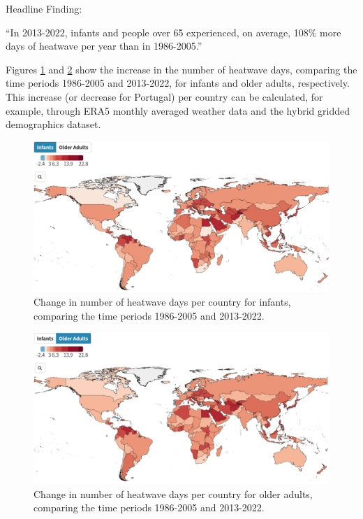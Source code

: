 \documentclass[
]{krantz}
\begin{document}
Headline Finding:

``In 2013-2022, infants and people over 65 experienced, on average, 108\% more days of heatwave per year than in 1986-2005.''

Figures \ref{fig:heatwaves1infantsstrobl} and \ref{fig:heatwaves1adultsstrobl} show the increase in the number of heatwave days, comparing the time periods 1986-2005 and 2013-2022, for infants and older adults, respectively. This increase (or decrease for Portugal) per country can be calculated, for example, through ERA5 monthly averaged weather data and the hybrid gridded demographics dataset.

\begin{figure}
\includegraphics[width=1\linewidth]{work/08-lancet/figures/indicator_1_1} \caption{Change in number of heatwave days per country for infants, comparing the time periods 1986-2005 and 2013-2022.}\label{fig:heatwaves1infantsstrobl}
\end{figure}
\begin{figure}
\includegraphics[width=1\linewidth]{work/08-lancet/figures/indicator_1_2} \caption{Change in number of heatwave days per country for older adults, comparing the time periods 1986-2005 and 2013-2022.}\label{fig:heatwaves1adultsstrobl}
\end{figure}
\end{document}
